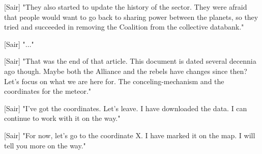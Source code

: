 \documentclass[a4paper,12pt]{article}
\begin{document}
[Sair] "They also started to update the history of the sector. They were afraid that people would want to go back to sharing power between the planets, so they tried
and succeeded in removing the Coalition from the collective databank."

[Sair] "..."

[Sair] "That was the end of that article. This document is dated several decennia ago though. Maybe both the Alliance and the rebels have changes since then? 
Let's focus on what we are here for. The conceling-mechanism and the coordinates for the meteor."

[Sair] "I've got the coordinates. Let's leave. I have downloaded the data. I can continue to work with it on the way."

[Sair] "For now, let's go to the coordinate X. I have marked it on the map. I will tell you more on the way."
\end{document}
